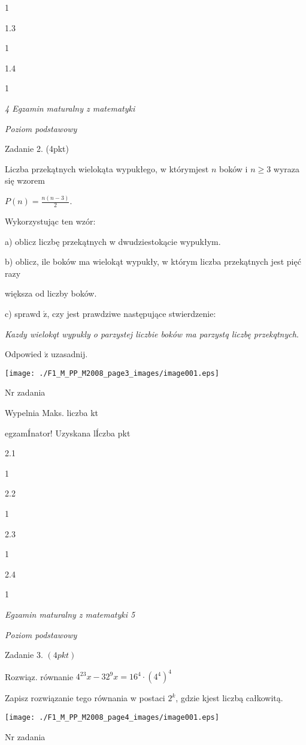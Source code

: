 \documentclass[a4paper,12pt]{article}
\begin{document}
1

1.3

1

1.4

1





{\it 4 Egzamin maturalny z matematyki}

{\it Poziom podstawowy}

Zadanie 2. (4pkt)

Liczba przekątnych wielokąta wypukłego, w którymjest $n$ boków i $n\geq 3$ wyraza się wzorem

$P(n)=\displaystyle \frac{n(n-3)}{2}.$

Wykorzystując ten wzór:

a) oblicz liczbę przekątnych w dwudziestokącie wypukłym.

b) oblicz, ile boków ma wielokąt wypukły, w którym liczba przekątnych jest pięć razy

większa od liczby boków.

c) sprawd $\acute{\mathrm{z}}$, czy jest prawdziwe następujące stwierdzenie:

{\it Kazdy wielokqt wypukly o parzystej liczbie boków ma parzystq liczbę przekqtnych}.

Odpowied $\acute{\mathrm{z}}$ uzasadnij.
\begin{center}
\texttt{[image: ./F1\_M\_PP\_M2008\_page3\_images/image001.eps]}
\end{center}
Nr zadania

Wypelnia Maks. liczba kt

egzamÍnator! Uzyskana lÍczba pkt

2.1

1

2.2

1

2.3

1

2.4

1





{\it Egzamin maturalny z matematyki 5}

{\it Poziom podstawowy}

Zadanie 3. $(4pkt)$

Rozwiąz. równanie $4^{23}x-32^{9}x=16^{4}\cdot(4^{4})^{4}$

Zapisz rozwiązanie tego równania w postaci $2^{k}$, gdzie kjest liczbą całkowitą.
\begin{center}
\texttt{[image: ./F1\_M\_PP\_M2008\_page4\_images/image001.eps]}
\end{center}
Nr zadania
\end{document}
